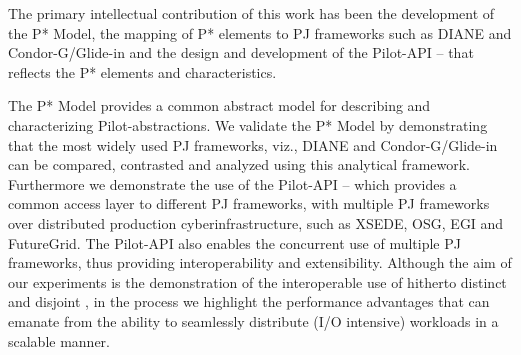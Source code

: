 \documentclass[conference]{IEEEtran}
\begin{document}







The primary intellectual contribution of this work has been the
development of the P* Model, the mapping of P* elements to PJ
frameworks such as DIANE and Condor-G/Glide-in and the design and
development of the Pilot-API -- that reflects the P* elements and
characteristics.  
 
The P* Model provides a common abstract model for describing and
characterizing Pilot-abstractions.  We validate the P* Model by
demonstrating that the most widely used PJ frameworks, viz., DIANE and
Condor-G/Glide-in can be compared, contrasted and analyzed using this
analytical framework.  Furthermore we demonstrate the use of the
Pilot-API -- which provides a common access layer to different PJ
frameworks, with multiple PJ frameworks over distributed production
cyberinfrastructure, such as XSEDE, OSG, EGI and FutureGrid. The
Pilot-API also enables the concurrent use of multiple PJ frameworks,
thus providing interoperability and extensibility.  Although the aim
of our experiments is the demonstration of the interoperable use of
hitherto distinct and disjoint \pilotjobs, in the process we highlight
the performance advantages that can emanate from the ability to
seamlessly distribute (I/O intensive) workloads in a scalable manner.
\end{document}
